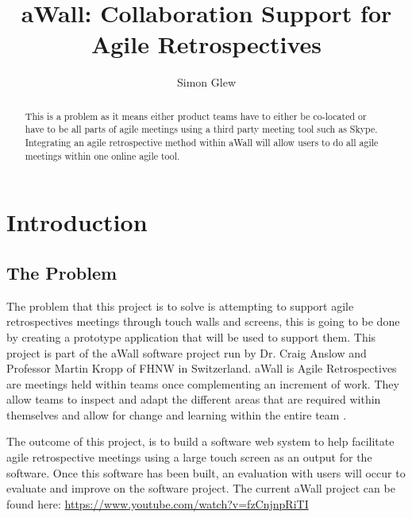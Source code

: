 \documentclass[11pt
              , a4paper
              , twoside
              , openright
              ]{report}
\title{aWall: Collaboration Support for Agile Retrospectives}
\author{Simon Glew}
\date{}
\begin{document}
\frontmatter



\begin{abstract}

This is a problem as it means either product teams have to either be co-located or have to be all parts of agile meetings using a third party meeting tool such as Skype. 
Integrating an agile retrospective method within aWall will allow users to do all agile meetings within one online agile tool.  

\end{abstract}


\maketitle


\mainmatter


\chapter{Introduction}\label{C:intro}
\section{The Problem} 
The problem that this project is to solve is attempting to support agile retrospectives meetings through touch walls and screens, this is going to be done by creating a prototype application that will be used to support them. This project is part of the aWall software project run by Dr. Craig Anslow and Professor Martin Kropp of FHNW in Switzerland. aWall is Agile Retrospectives are meetings held within teams once complementing an increment of work. They allow teams to inspect and adapt the different areas that are required within themselves and allow for change and learning within the entire team \cite{AgileRetrospectivesEstherDerby}.

The outcome of this project, is to build a software web system to help facilitate agile retrospective meetings using a large touch screen as an output for the software. Once this software has been built, an evaluation with users will occur to evaluate and improve on the software project. The current aWall project can be found here: \url{https://www.youtube.com/watch?v=fzCnjnpRiTI}
\end{document}
